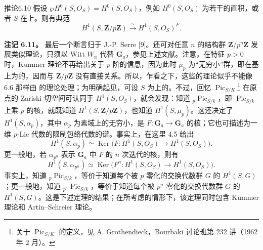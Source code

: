 \begin{SGAresult}{推论}{6.10}
假设 $\wp H^0(S,O_S)=H^0(S,O_S)$，例如 $H^0(S,O_S)$ 为若干的直积，或者 $S$ 在上。则有典范
\[
H^1(S,\mathbf Z/p\mathbf Z)\xrightarrow{\sim}H^1(S,O_S)^F.
\]
\end{SGAresult}
\textbf{注记 6.11。} 最后一个断言归于 J.-P. Serre [9]。还可对任意 $n$ 的结构群 $\mathbf Z/p^n\mathbf Z$ 发展类似理论，只须以 Witt  $W_n$ 代替 $\mathbf G_a$，参见上述文献。注意，在特征 $p>0$ 时，Kummer 理论不再给出关于 $p$ 阶的信息，因为此时 $\mu_p$ 为“无穷小”群，即在基上为的，因而与 $\mathbf Z/p\mathbf Z$ 没有直接关系。所以，乍看之下，这些的理论似乎不能像 6.6 那样由 的理论处理；为明确起见，可设 $S$ 为上的。不过，回忆 $\operatorname{Pic}_{S/K}$\footnote{关于 $\operatorname{Pic}_{S/K}$ 的定义，见 A. Grothendieck，Bourbaki 讨论班第 232 讲（1962 年 2 月）。} 在原点的 Zariski 切空间可认同于 $H^1(S,O_S)$，就会发现：知道 $ {}_p\operatorname{Pic}_{S/k}$，即 $\operatorname{Pic}_{S/k}$ 上乘 $p$ 的核，就既知道 $H^1(S,\mathbf Z/p\mathbf Z)$，也知道 $H^1(S,\mu_p)$。这还决定了 $H^1(S,\alpha_p)$，其中 $\alpha_p$ 为素域上的无穷小，是 $F:\mathbf G_a\to\mathbf G_a$ 的核；它也可描述为一维 $p$-Lie 代数的限制包络代数的谱。事实上，在这里 4.5 给出
\[
H^1(S,\alpha_p)\simeq
\operatorname{Ker}\bigl(F:H^1(S,O_S)\longrightarrow H^1(S,O_S)\bigr).
\]
更一般地，若 $\alpha_{p^n}$ 表示 $\mathbf G_a$ 中 $F$ 的 $n$ 次迭代的核，则有
\[
H^1(S,\alpha_{p^n})\simeq
\operatorname{Ker}\bigl(F^n:H^1(S,O_S)\longrightarrow H^1(S,O_S)\bigr).
\]
事实上，知道 $ {}_p\operatorname{Pic}_{S/k}$，等价于知道每个被 $p$ 零化的交换代数群 $G$ 的 $H^1(S,G)$；更一般地，知道 $ {}_{p^n}\operatorname{Pic}_{S/k}$，等价于知道每个被 $p^n$ 零化的交换代数群 $G$ 的 $H^1(S,G)$。这是下述定理的结果；在所考虑的情形下，该定理同时包含 Kummer 理论和 Artin–Schreier 理论。

